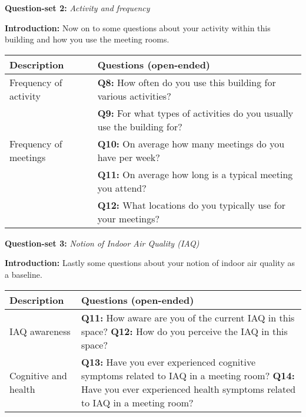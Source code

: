 \begin{appendices}
\vspace{-10pt}

\begin{table}[htbp]
    \captionsetup{justification=raggedright,singlelinecheck=false}
    \raggedright \textbf{Question-set 2:} \textit{Activity and frequency} \\
    \label{tab:column_widths}
    \raggedright \textbf{Introduction:} Now on to some questions about your activity within this building and how you use the meeting rooms.
    \begin{tabularx}{\textwidth}{|p{}|X|}
        \hline
        \textbf{Description} & \textbf{Questions (open-ended)} \\
        \hline
        Frequency of activity & \textbf{Q8:} How often do you use this building for various activities? \\
        & \textbf{Q9:} For what types of activities do you usually use the building for? \\
        \hline
        Frequency of meetings & \textbf{Q10:} On average how many meetings do you have per week? \\
        & \textbf{Q11:} On average how long is a typical meeting you attend? \\
        & \textbf{Q12:} What locations do you typically use for your meetings? \\
        \hline
    \end{tabularx}
\end{table}

\vspace{-10pt}

\begin{table}[htbp]
    \captionsetup{justification=raggedright,singlelinecheck=false}
    \raggedright \textbf{Question-set 3:} \textit{Notion of Indoor Air Quality (IAQ)} \\
    \label{tab:column_widths}
    \raggedright \textbf{Introduction:} Lastly some questions about your notion of indoor air quality as a baseline.
    \begin{tabularx}{\textwidth}{|p{}|X|}
        \hline
        \textbf{Description} & \textbf{Questions (open-ended)} \\
        \hline
        IAQ awareness & \textbf{Q11:} How aware are you of the current IAQ in this space? 
        \newline
        \textbf{Q12:} How do you perceive the IAQ in this space? \\
        \hline
        Cognitive and health & \textbf{Q13:} Have you ever experienced cognitive symptoms related to IAQ in a meeting room? 
        \newline
        \textbf{Q14:} Have you ever experienced health symptoms related to IAQ in a meeting room?  \\
        \hline
    \end{tabularx}
\end{table}


\end{appendices}
